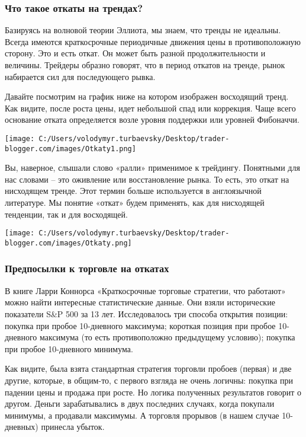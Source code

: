 \documentclass[a5paper]{article}
\begin{document}
\subsubsection{Что такое откаты на трендах?}

Базируясь на волновой теории Эллиота, мы знаем, что тренды не идеальны. Всегда имеются краткосрочные периодичные движения цены в противоположную сторону. Это и есть откат. Он может быть разной продолжительности и величины. Трейдеры образно говорят, что в период откатов на тренде, рынок набирается сил для последующего рывка.

Давайте посмотрим на график ниже на котором изображен восходящий
тренд. Как видите, после роста цены, идет небольшой спад или
коррекция. Чаще всего основание отката определяется возле уровня
поддержки или уровней Фибоначчи.

\texttt{[image: C:/Users/volodymyr.turbaevsky/Desktop/trader-blogger.com/images/Otkaty1.png]}

Вы, наверное, слышали слово «ралли» применимое к трейдингу. Понятными
для нас словами – это оживление или восстановление рынка. То есть, это
откат на нисходящем тренде. Этот термин больше используется в
англоязычной литературе. Мы понятие «откат» будем применять, как для
нисходящей тенденции, так и для восходящей.

\texttt{[image: C:/Users/volodymyr.turbaevsky/Desktop/trader-blogger.com/images/Otkaty.png]}

\subsubsection{Предпосылки к торговле на откатах}

В книге Ларри Коннорса «Краткосрочные торговые стратегии, что работают» можно найти интересные статистические данные. Они взяли исторические показатели S\&P 500 за 13 лет. Исследовалось три способа открытия позиции: покупка при пробое 10-дневного максимума; короткая позиция при пробое 10-дневного максимума  (то есть противоположно предыдущему условию); покупка при пробое 10-дневного минимума.

Как видите, была взята стандартная стратегия торговли пробоев (первая) и две другие, которые, в общим-то, с первого взгляда не очень логичны: покупка при падении цены и продажа при росте. Но логика полученных результатов говорит о другом. Деньги зарабатывались в двух последних случаях, когда покупали минимумы, а продавали максимумы. А торговля прорывов (в нашем случае 10-дневных) принесла убыток.
\end{document}
